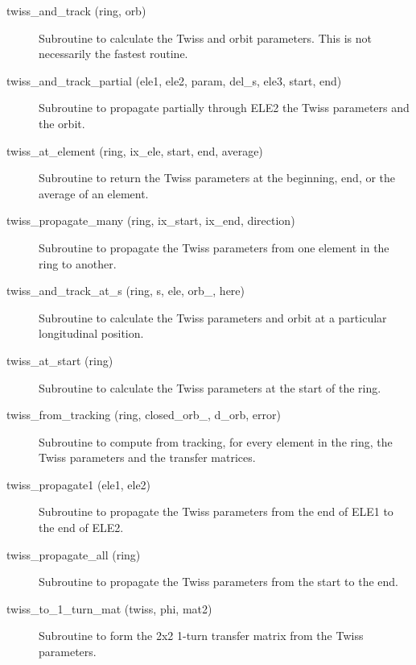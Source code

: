 \begin{description}
\item[twiss\_and\_track (ring, orb)] \Newline
Subroutine to calculate the Twiss and orbit parameters. 
This is not necessarily the fastest routine. 

\item[twiss\_and\_track\_partial (ele1, ele2, param, del\_s, ele3, start, end)] \Newline
Subroutine to propagate partially through ELE2 the Twiss parameters and the orbit. 

\item[twiss\_at\_element (ring, ix\_ele, start, end, average)] \Newline
Subroutine to return the Twiss parameters at the beginning, end, or the average of an element. 

\item[twiss\_propagate\_many (ring, ix\_start, ix\_end, direction)] \Newline
Subroutine to propagate the Twiss parameters from one element in the ring to another. 

\item[twiss\_and\_track\_at\_s (ring, s, ele, orb\_, here)] \Newline
Subroutine to calculate the Twiss parameters and orbit at a particular longitudinal position. 

\item[twiss\_at\_start (ring)] \Newline
Subroutine to calculate the Twiss parameters at the start of the ring. 

\item[twiss\_from\_tracking (ring, closed\_orb\_, d\_orb, error)] \Newline
Subroutine to compute from tracking, for every element in the ring, 
the Twiss parameters and the transfer matrices. 

\item[twiss\_propagate1 (ele1, ele2)] \Newline
Subroutine to propagate the Twiss parameters from the end of ELE1 to the end of ELE2. 

\item[twiss\_propagate\_all (ring)] \Newline
Subroutine to propagate the Twiss parameters from the start to the end. 

\item[twiss\_to\_1\_turn\_mat (twiss, phi, mat2)] \Newline
Subroutine to form the 2x2 1-turn transfer matrix from the Twiss parameters. 

\end{description}

